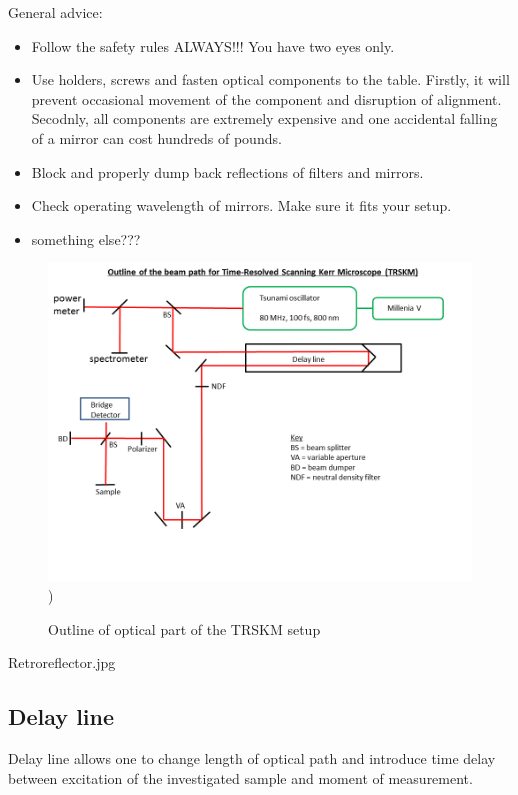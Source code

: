 \documentclass[14pt,a4paper] {article}
\begin{document}
General advice:
\begin{itemize}
\item Follow the safety rules ALWAYS!!! You have two eyes only.
\item Use holders, screws and fasten optical components to the table. Firstly, it will prevent occasional movement of the component and disruption of alignment. Secodnly, all components are extremely expensive and one accidental falling of a mirror can cost hundreds of pounds.
\item Block and properly dump back reflections of filters and mirrors.
\item Check operating wavelength of mirrors. Make sure it fits your setup.
\item something else???   
\end{itemize}

\begin{figure}
\includegraphics[width = 1\linewidth]{TRSKM-outline.png})
\caption{Outline of optical part of the TRSKM setup}
\label{fig:optic_outline} 
\end{figure}


Retroreflector.jpg

\subsection{Delay line}
Delay line allows one to change length of optical path and introduce time delay between excitation of the investigated sample and moment of measurement.

\end{document}
